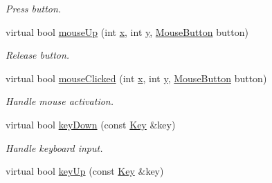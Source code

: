 \begin{DoxyCompactItemize}
\begin{DoxyCompactList}\small\item\em Press button. \end{DoxyCompactList}\item 
\hypertarget{classGUI_1_1Button_a49f6da9536005b08a02678209378b11e}{virtual bool \hyperlink{classGUI_1_1Button_a49f6da9536005b08a02678209378b11e}{mouse\-Up} (int \hyperlink{classGUI_1_1Window_a6ca6a80ca00c9e1d8ceea8d3d99a657d}{x}, int \hyperlink{classGUI_1_1Window_a0ee8e923aff2c3661fc2e17656d37adf}{y}, \hyperlink{namespaceGUI_ad06082a7b02aa73697f39eb8e0856de9}{Mouse\-Button} button)}\label{classGUI_1_1Button_a49f6da9536005b08a02678209378b11e}

\begin{DoxyCompactList}\small\item\em Release button. \end{DoxyCompactList}\item 
\hypertarget{classGUI_1_1Button_a88a1ed778b528d75a55351f2e3a00cf1}{virtual bool \hyperlink{classGUI_1_1Button_a88a1ed778b528d75a55351f2e3a00cf1}{mouse\-Clicked} (int \hyperlink{classGUI_1_1Window_a6ca6a80ca00c9e1d8ceea8d3d99a657d}{x}, int \hyperlink{classGUI_1_1Window_a0ee8e923aff2c3661fc2e17656d37adf}{y}, \hyperlink{namespaceGUI_ad06082a7b02aa73697f39eb8e0856de9}{Mouse\-Button} button)}\label{classGUI_1_1Button_a88a1ed778b528d75a55351f2e3a00cf1}

\begin{DoxyCompactList}\small\item\em Handle mouse activation. \end{DoxyCompactList}\item 
\hypertarget{classGUI_1_1Button_a0eafdb8f5c02244701ff27d9e1ca2337}{virtual bool \hyperlink{classGUI_1_1Button_a0eafdb8f5c02244701ff27d9e1ca2337}{key\-Down} (const \hyperlink{classGUI_1_1Key}{Key} \&key)}\label{classGUI_1_1Button_a0eafdb8f5c02244701ff27d9e1ca2337}

\begin{DoxyCompactList}\small\item\em Handle keyboard input. \end{DoxyCompactList}\item 
\hypertarget{classGUI_1_1Button_a211b435d6d91e11ff1e778b9ee6c9c73}{virtual bool \hyperlink{classGUI_1_1Button_a211b435d6d91e11ff1e778b9ee6c9c73}{key\-Up} (const \hyperlink{classGUI_1_1Key}{Key} \&key)}\label{classGUI_1_1Button_a211b435d6d91e11ff1e778b9ee6c9c73}


\end{DoxyCompactItemize}
